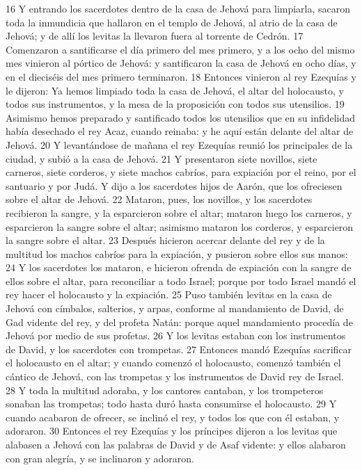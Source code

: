 16 Y entrando los sacerdotes dentro de la casa de Jehová para limpiarla, sacaron toda la inmundicia que hallaron en el templo de Jehová, al atrio de la casa de Jehová; y de allí los levitas la llevaron fuera al torrente de Cedrón.
17 Comenzaron a santificarse el día primero del mes primero, y a los ocho del mismo mes vinieron al pórtico de Jehová: y santificaron la casa de Jehová en ocho días, y en el dieciséis del mes primero terminaron.
18 Entonces vinieron al rey Ezequías y le dijeron: Ya hemos limpiado toda la casa de Jehová, el altar del holocausto, y todos sus instrumentos, y la mesa de la proposición con todos sus utensilios.
19 Asimismo hemos preparado y santificado todos los utensilios que en su infidelidad había desechado el rey Acaz, cuando reinaba: y he aquí están delante del altar de Jehová.
20 Y levantándose de mañana el rey Ezequías reunió los principales de la ciudad, y subió a la casa de Jehová.
21 Y presentaron siete novillos, siete carneros, siete corderos, y siete machos cabríos, para expiación por el reino, por el santuario y por Judá. Y dijo a los sacerdotes hijos de Aarón, que los ofreciesen sobre el altar de Jehová.
22 Mataron, pues, los novillos, y los sacerdotes recibieron la sangre, y la esparcieron sobre el altar; mataron luego los carneros, y esparcieron la sangre sobre el altar; asimismo mataron los corderos, y esparcieron la sangre sobre el altar.
23 Después hicieron acercar delante del rey y de la multitud los machos cabríos para la expiación, y pusieron sobre ellos sus manos:
24 Y los sacerdotes los mataron, e hicieron ofrenda de expiación con la sangre de ellos sobre el altar, para reconciliar a todo Israel; porque por todo Israel mandó el rey hacer el holocausto y la expiación.
25 Puso también levitas en la casa de Jehová con címbalos, salterios, y arpas, conforme al mandamiento de David, de Gad vidente del rey, y del profeta Natán: porque aquel mandamiento procedía de Jehová por medio de sus profetas.
26 Y los levitas estaban con los instrumentos de David, y los sacerdotes con trompetas.
27 Entonces mandó Ezequías sacrificar el holocausto en el altar; y cuando comenzó el holocausto, comenzó también el cántico de Jehová, con las trompetas y los instrumentos de David rey de Israel.
28 Y toda la multitud adoraba, y los cantores cantaban, y los trompeteros sonaban las trompetas; todo hasta duró hasta consumirse el holocausto.
29 Y cuando acabaron de ofrecer, se inclinó el rey, y todos los que con él estaban, y adoraron.
30 Entonces el rey Ezequías y los príncipes dijeron a los levitas que alabasen a Jehová con las palabras de David y de Asaf vidente: y ellos alabaron con gran alegría, y se inclinaron y adoraron.
